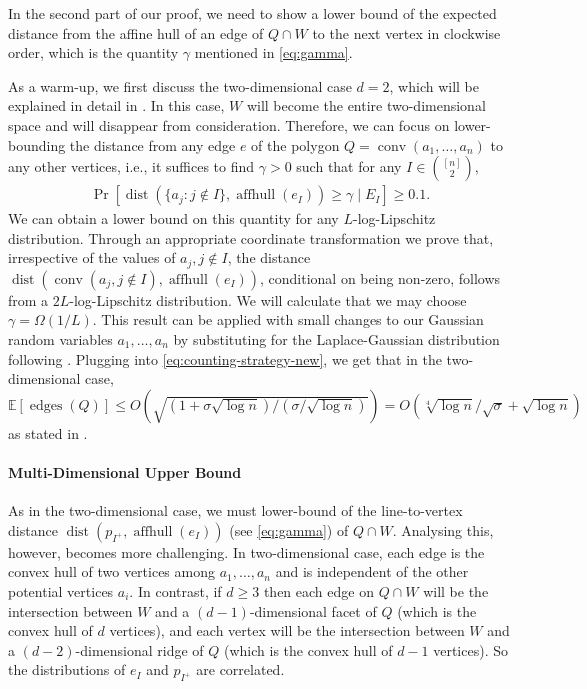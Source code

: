 \documentclass{article}\usepackage[a4paper,margin=20mm]{geometry}
\newcommand{\E}{\mathbb E}
\newcommand{\aff}{\operatorname{affhull}}
\newcommand{\conv}{\operatorname{conv}}
\newcommand{\edges}{\operatorname{edges}}
\newcommand{\dist}{\operatorname{dist}}
\begin{document}
In the second part of our proof, we need to show a lower bound of the expected
distance from the affine hull of an edge of $Q \cap W$ to the next vertex in clockwise order,
which is the quantity $\gamma$ mentioned in \eqref{eq:gamma}. 

As a warm-up, we first discuss the two-dimensional case $d=2$, which will be explained in detail in .
In this case, $W$ will become the entire two-dimensional space and will disappear from consideration. 
Therefore, we can focus on lower-bounding the distance from any edge $e$ of the polygon $Q = \conv(a_1, \ldots, a_n)$ to any other vertices, i.e., it suffices to find $\gamma > 0$ such that for any $I \in \binom{[n]}{2}$,
\begin{align*}
    \Pr[ \dist(\{a_j : j \notin I\}, \aff(e_I)) \geq \gamma \mid E_I] \geq 0.1.
\end{align*}
We can obtain a lower bound on this quantity for any $L$-log-Lipschitz distribution.
Through an appropriate coordinate transformation we prove that,
irrespective of the values of $a_j, j \notin I$,
the distance $\dist(\conv(a_j, j \notin I), \aff(e_I))$, conditional on being non-zero,
follows from a $2L$-log-Lipschitz distribution.
We will calculate that we may choose $\gamma = \Omega(1/L)$.
This result can be applied with small changes to our Gaussian random variables $a_1, \ldots, a_n$
by substituting for the Laplace-Gaussian distribution following \cite{DH18}.
Plugging into \eqref{eq:counting-strategy-new}, we get that in the
two-dimensional case,
$\E[\edges(Q)] \leq O(\sqrt{(1+\sigma\sqrt{\log n})/(\sigma/\sqrt{\log n})}) = O(\sqrt[4]{\log n} / \sqrt{\sigma} + \sqrt{ \log n})$
as stated in .



\paragraph{Multi-Dimensional Upper Bound}

As in the two-dimensional case, we must lower-bound of the line-to-vertex distance $\dist(p_{I^+}, \aff(e_I))$ (see \eqref{eq:gamma}) of $Q \cap W$.
Analysing this, however, becomes more challenging.
In two-dimensional case, each edge is the convex hull of two vertices among $a_1, \ldots, a_n$ and is independent of the other potential vertices $a_i$. 
In contrast, if $d \geq 3$ then each edge on $Q \cap W$ will be the intersection between $W$ and a $(d-1)$-dimensional facet of $Q$ (which is the convex hull of $d$ vertices), and each vertex will be the intersection between $W$ and a $(d-2)$-dimensional ridge of $Q$ (which is the convex hull of $d-1$ vertices). 
So the distributions of $e_I$ and $p_{I^+}$ are correlated.
\end{document}
